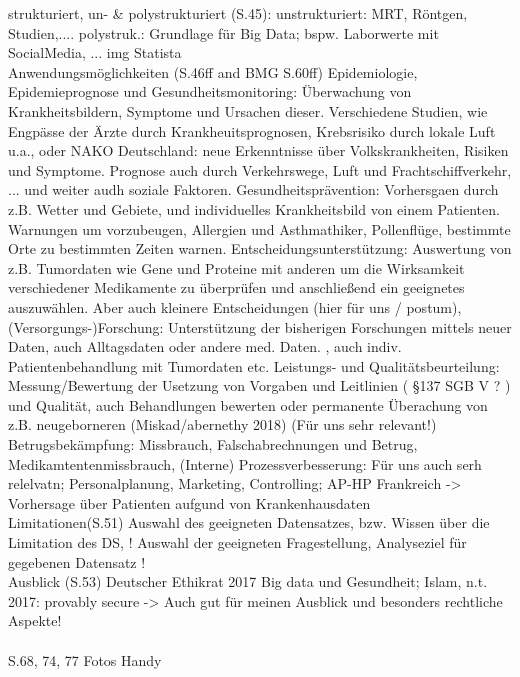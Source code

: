 strukturiert, un- \& polystrukturiert (S.45): 
unstrukturiert: MRT, Röntgen, Studien,....
polystruk.: Grundlage für Big Data; bspw. Laborwerte mit SocialMedia, ...
img Statista\\


Anwendungsmöglichkeiten (S.46ff and BMG S.60ff) Epidemiologie, Epidemieprognose und Gesundheitsmonitoring: Überwachung von Krankheitsbildern, Symptome und Ursachen dieser. Verschiedene Studien, wie Engpässe der Ärzte durch Krankheuitsprognosen, Krebsrisiko durch lokale Luft u.a., oder NAKO Deutschland: neue Erkenntnisse über Volkskrankheiten, Risiken und Symptome. Prognose auch durch Verkehrswege, Luft und Frachtschiffverkehr, ... und weiter audh soziale Faktoren.
Gesundheitsprävention: Vorhersgaen durch z.B. Wetter und Gebiete, und individuelles Krankheitsbild von einem Patienten. Warnungen um vorzubeugen, Allergien und Asthmathiker, Pollenflüge, bestimmte Orte zu bestimmten Zeiten warnen.
Entscheidungsunterstützung: Auswertung von z.B. Tumordaten wie Gene und Proteine mit anderen um die Wirksamkeit verschiedener Medikamente zu überprüfen und anschließend ein geeignetes auszuwählen. Aber auch kleinere Entscheidungen (hier für uns / postum),
(Versorgungs-)Forschung: Unterstützung der bisherigen Forschungen mittels neuer Daten, auch Alltagsdaten oder andere med. Daten. , auch indiv. Patientenbehandlung mit Tumordaten etc.
Leistungs- und Qualitätsbeurteilung: Messung/Bewertung  der Usetzung von Vorgaben und Leitlinien ( §137 SGB V ? ) und Qualität, auch Behandlungen bewerten oder permanente Überachung von z.B. neugeborneren (Miskad/abernethy 2018) (Für uns sehr relevant!)
Betrugsbekämpfung: Missbrauch, Falschabrechnungen und Betrug, Medikamtentenmissbrauch,
(Interne) Prozessverbesserung: Für uns auch serh relelvatn; Personalplanung, Marketing, Controlling; AP-HP Frankreich -> Vorhersage über Patienten aufgund von Krankenhausdaten
\\

Limitationen(S.51) Auswahl des geeigneten Datensatzes, bzw. Wissen über die Limitation des DS, ! Auswahl der geeigneten Fragestellung, Analyseziel für gegebenen Datensatz !\\

Ausblick (S.53)  Deutscher Ethikrat 2017 Big data und Gesundheit; Islam, n.t. 2017: provably secure -> Auch gut für meinen Ausblick und besonders rechtliche Aspekte!\\ \\


S.68, 74, 77 Fotos Handy\\ \\


